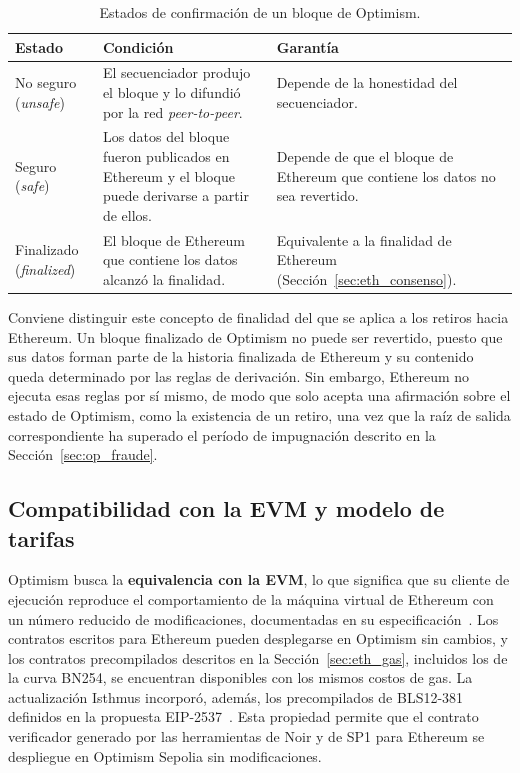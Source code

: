 \begin{table}[htbp]
	\centering
	\caption{Estados de confirmación de un bloque de Optimism.}
	\label{tab:op_estados}
	\small
	\begin{tabular}{>{\raggedright\arraybackslash}p{2.6cm} >{\raggedright\arraybackslash}p{6.2cm} >{\raggedright\arraybackslash}p{5.4cm}}
		\toprule
		\textbf{Estado} & \textbf{Condición} & \textbf{Garantía} \\
		\midrule
		No seguro (\textit{unsafe}) & El secuenciador produjo el bloque y lo difundió por la red
		\textit{peer-to-peer}. & Depende de la honestidad del secuenciador. \\
		\addlinespace
		Seguro (\textit{safe}) & Los datos del bloque fueron publicados en Ethereum y el bloque
		puede derivarse a partir de ellos. & Depende de que el bloque de Ethereum que contiene los
		datos no sea revertido. \\
		\addlinespace
		Finalizado (\textit{finalized}) & El bloque de Ethereum que contiene los datos alcanzó la
		finalidad. & Equivalente a la finalidad de Ethereum
		(Sección~\ref{sec:eth_consenso}). \\
		\bottomrule
	\end{tabular}
\end{table}

Conviene distinguir este concepto de finalidad del que se aplica a los retiros hacia Ethereum.
Un bloque finalizado de Optimism no puede ser revertido, puesto que sus datos forman parte de la
historia finalizada de Ethereum y su contenido queda determinado por las reglas de derivación.
Sin embargo, Ethereum no ejecuta esas reglas por sí mismo, de modo que solo acepta una afirmación
sobre el estado de Optimism, como la existencia de un retiro, una vez que la raíz de salida
correspondiente ha superado el período de impugnación descrito en la
Sección~\ref{sec:op_fraude}.

\subsection{Compatibilidad con la EVM y modelo de tarifas}
\label{sec:op_tarifas}

Optimism busca la \textbf{equivalencia con la EVM}, lo que significa que su cliente de ejecución
reproduce el comportamiento de la máquina virtual de Ethereum con un número reducido de
modificaciones, documentadas en su especificación~\cite{opspecsexec}. Los contratos escritos para
Ethereum pueden desplegarse en Optimism sin cambios, y los contratos precompilados descritos en la
Sección~\ref{sec:eth_gas}, incluidos los de la curva BN254, se encuentran disponibles con los
mismos costos de gas. La actualización Isthmus incorporó, además, los precompilados de BLS12-381
definidos en la propuesta EIP-2537~\cite{opisthmus, eip2537}. Esta propiedad permite que el
contrato verificador generado por las herramientas de Noir y de SP1 para Ethereum se despliegue
en Optimism Sepolia sin modificaciones.

